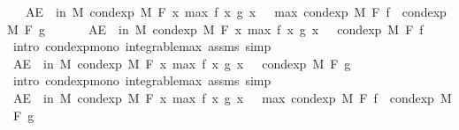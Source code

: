 \begin{isabellebody}
\ \ \ {\isachardoublequoteopen}AE\ {\isasymxi}\ in\ M{\isachardot}{\kern0pt}\ cond{\isacharunderscore}{\kern0pt}exp\ M\ F\ {\isacharparenleft}{\kern0pt}{\isasymlambda}x{\isachardot}{\kern0pt}\ max\ {\isacharparenleft}{\kern0pt}f\ x{\isacharparenright}{\kern0pt}\ {\isacharparenleft}{\kern0pt}g\ x{\isacharparenright}{\kern0pt}{\isacharparenright}{\kern0pt}\ {\isasymxi}\ {\isasymge}\ max\ {\isacharparenleft}{\kern0pt}cond{\isacharunderscore}{\kern0pt}exp\ M\ F\ f\ {\isasymxi}{\isacharparenright}{\kern0pt}\ {\isacharparenleft}{\kern0pt}cond{\isacharunderscore}{\kern0pt}exp\ M\ F\ g\ {\isasymxi}{\isacharparenright}{\kern0pt}{\isachardoublequoteclose}\isanewline
%
\isadelimproof
%
\endisadelimproof
%
\isatagproof
{}\isamarkupfalse%
\ {\isacharminus}{\kern0pt}\isanewline
\ \ \isamarkupfalse%
\ {\isachardoublequoteopen}AE\ {\isasymxi}\ in\ M{\isachardot}{\kern0pt}\ cond{\isacharunderscore}{\kern0pt}exp\ M\ F\ {\isacharparenleft}{\kern0pt}{\isasymlambda}x{\isachardot}{\kern0pt}\ max\ {\isacharparenleft}{\kern0pt}f\ x{\isacharparenright}{\kern0pt}\ {\isacharparenleft}{\kern0pt}g\ x{\isacharparenright}{\kern0pt}{\isacharparenright}{\kern0pt}\ {\isasymxi}\ {\isasymge}\ cond{\isacharunderscore}{\kern0pt}exp\ M\ F\ f\ {\isasymxi}{\isachardoublequoteclose}\ \isamarkupfalse%
\ {\isacharparenleft}{\kern0pt}intro\ cond{\isacharunderscore}{\kern0pt}exp{\isacharunderscore}{\kern0pt}mono\ integrable{\isacharunderscore}{\kern0pt}max\ assms{\isacharcomma}{\kern0pt}\ simp{\isacharparenright}{\kern0pt}\isanewline
\ \ \isamarkupfalse%
\ \isamarkupfalse%
\ {\isachardoublequoteopen}AE\ {\isasymxi}\ in\ M{\isachardot}{\kern0pt}\ cond{\isacharunderscore}{\kern0pt}exp\ M\ F\ {\isacharparenleft}{\kern0pt}{\isasymlambda}x{\isachardot}{\kern0pt}\ max\ {\isacharparenleft}{\kern0pt}f\ x{\isacharparenright}{\kern0pt}\ {\isacharparenleft}{\kern0pt}g\ x{\isacharparenright}{\kern0pt}{\isacharparenright}{\kern0pt}\ {\isasymxi}\ {\isasymge}\ cond{\isacharunderscore}{\kern0pt}exp\ M\ F\ g\ {\isasymxi}{\isachardoublequoteclose}\ \isamarkupfalse%
\ {\isacharparenleft}{\kern0pt}intro\ cond{\isacharunderscore}{\kern0pt}exp{\isacharunderscore}{\kern0pt}mono\ integrable{\isacharunderscore}{\kern0pt}max\ assms{\isacharcomma}{\kern0pt}\ simp{\isacharparenright}{\kern0pt}\isanewline
\ \ \isamarkupfalse%
\ \isamarkupfalse%
\ {\isachardoublequoteopen}AE\ {\isasymxi}\ in\ M{\isachardot}{\kern0pt}\ cond{\isacharunderscore}{\kern0pt}exp\ M\ F\ {\isacharparenleft}{\kern0pt}{\isasymlambda}x{\isachardot}{\kern0pt}\ max\ {\isacharparenleft}{\kern0pt}f\ x{\isacharparenright}{\kern0pt}\ {\isacharparenleft}{\kern0pt}g\ x{\isacharparenright}{\kern0pt}{\isacharparenright}{\kern0pt}\ {\isasymxi}\ {\isasymge}\ max\ {\isacharparenleft}{\kern0pt}cond{\isacharunderscore}{\kern0pt}exp\ M\ F\ f\ {\isasymxi}{\isacharparenright}{\kern0pt}\ {\isacharparenleft}{\kern0pt}cond{\isacharunderscore}{\kern0pt}exp\ M\ F\ g\ {\isasymxi}{\isacharparenright}{\kern0pt}{\isachardoublequoteclose}\ \isamarkupfalse%

\end{isabellebody}
